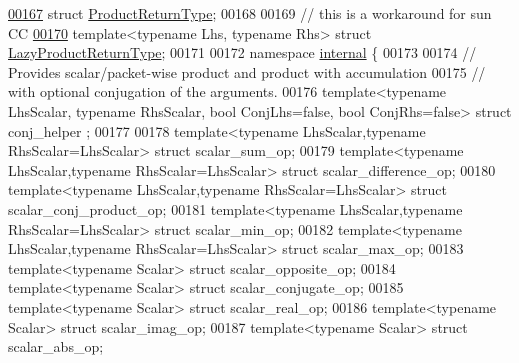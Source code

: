 \begin{DoxyCode}
\hyperlink{struct_eigen_1_1_product_return_type}{00167} \textcolor{keyword}{struct }\hyperlink{struct_eigen_1_1_product_return_type}{ProductReturnType};
00168 
00169 \textcolor{comment}{// this is a workaround for sun CC}
\hyperlink{struct_eigen_1_1_lazy_product_return_type}{00170} \textcolor{keyword}{template}<\textcolor{keyword}{typename} Lhs, \textcolor{keyword}{typename} Rhs> \textcolor{keyword}{struct }\hyperlink{struct_eigen_1_1_lazy_product_return_type}{LazyProductReturnType};
00171 
00172 \textcolor{keyword}{namespace }\hyperlink{namespaceinternal}{internal} \{
00173 
00174 \textcolor{comment}{// Provides scalar/packet-wise product and product with accumulation}
00175 \textcolor{comment}{// with optional conjugation of the arguments.}
00176 \textcolor{keyword}{template}<\textcolor{keyword}{typename} LhsScalar, \textcolor{keyword}{typename} RhsScalar, \textcolor{keywordtype}{bool} ConjLhs=false, \textcolor{keywordtype}{bool} ConjRhs=false> \textcolor{keyword}{struct }conj\_helper
      ;
00177 
00178 \textcolor{keyword}{template}<\textcolor{keyword}{typename} LhsScalar,\textcolor{keyword}{typename} RhsScalar=LhsScalar> \textcolor{keyword}{struct }scalar\_sum\_op;
00179 \textcolor{keyword}{template}<\textcolor{keyword}{typename} LhsScalar,\textcolor{keyword}{typename} RhsScalar=LhsScalar> \textcolor{keyword}{struct }scalar\_difference\_op;
00180 \textcolor{keyword}{template}<\textcolor{keyword}{typename} LhsScalar,\textcolor{keyword}{typename} RhsScalar=LhsScalar> \textcolor{keyword}{struct }scalar\_conj\_product\_op;
00181 \textcolor{keyword}{template}<\textcolor{keyword}{typename} LhsScalar,\textcolor{keyword}{typename} RhsScalar=LhsScalar> \textcolor{keyword}{struct }scalar\_min\_op;
00182 \textcolor{keyword}{template}<\textcolor{keyword}{typename} LhsScalar,\textcolor{keyword}{typename} RhsScalar=LhsScalar> \textcolor{keyword}{struct }scalar\_max\_op;
00183 \textcolor{keyword}{template}<\textcolor{keyword}{typename} Scalar> \textcolor{keyword}{struct }scalar\_opposite\_op;
00184 \textcolor{keyword}{template}<\textcolor{keyword}{typename} Scalar> \textcolor{keyword}{struct }scalar\_conjugate\_op;
00185 \textcolor{keyword}{template}<\textcolor{keyword}{typename} Scalar> \textcolor{keyword}{struct }scalar\_real\_op;
00186 \textcolor{keyword}{template}<\textcolor{keyword}{typename} Scalar> \textcolor{keyword}{struct }scalar\_imag\_op;
00187 \textcolor{keyword}{template}<\textcolor{keyword}{typename} Scalar> \textcolor{keyword}{struct }scalar\_abs\_op;

\end{DoxyCode}
